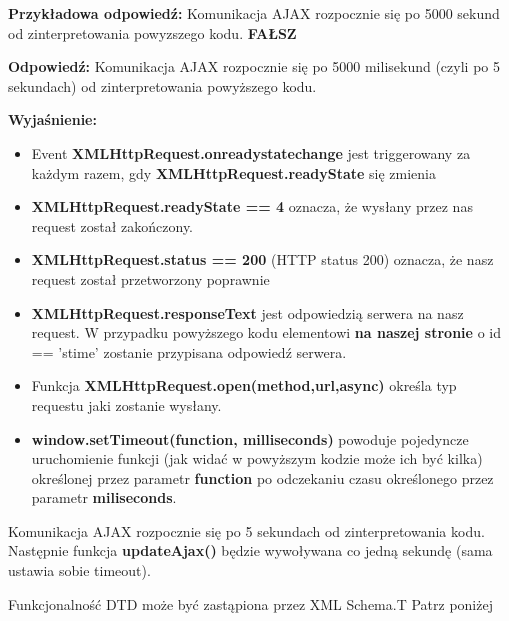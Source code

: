 \noindent
{\textbf{Przykładowa odpowiedź:}}
Komunikacja AJAX rozpocznie się po 5000 sekund od zinterpretowania powyzszego kodu.
\textbf{FAŁSZ}

\vspace{0.4cm}
\noindent
\textbf{Odpowiedź:}
Komunikacja AJAX rozpocznie się po 5000 milisekund (czyli po 5 sekundach) od zinterpretowania powyższego kodu.

\vspace{0.4cm}
\noindent
\textbf{Wyjaśnienie:}

\begin{itemize}
\item{Event \textbf{XMLHttpRequest.onreadystatechange} jest triggerowany za każdym razem, gdy
\textbf{XMLHttpRequest.readyState} się zmienia}

\item{\textbf{XMLHttpRequest.readyState == 4} oznacza, że wysłany przez nas request został zakończony.}

\item{\textbf{XMLHttpRequest.status == 200 } (HTTP status 200) oznacza, że nasz request został przetworzony poprawnie}

\item{\textbf{XMLHttpRequest.responseText} jest odpowiedzią serwera na nasz request. W przypadku powyższego kodu elementowi \textbf{na naszej stronie} o id == 'stime' zostanie przypisana odpowiedź serwera.} 

\item{Funkcja \textbf{XMLHttpRequest.open(method,url,async)} określa typ requestu jaki zostanie wysłany. }

\item{\textbf{window.setTimeout(function, milliseconds)} powoduje pojedyncze uruchomienie funkcji (jak widać w powyższym kodzie może ich być kilka) określonej przez parametr \textbf{function} po odczekaniu czasu określonego przez parametr \textbf{miliseconds}.}

\end{itemize}
Komunikacja AJAX rozpocznie się po 5 sekundach od zinterpretowania kodu. Następnie funkcja \textbf{updateAjax()} będzie wywoływana co jedną sekundę (sama ustawia sobie timeout).


\vspace{0.4cm}
\noindent


{Funkcjonalność DTD może być zastąpiona przez XML Schema.}{T}
{Patrz poniżej}
{\\}

